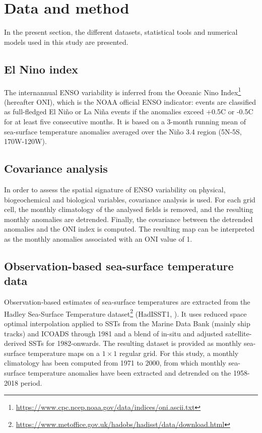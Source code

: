 \section{Data and method}

In the present section, the different datasets, statistical tools and numerical models used in this study are presented.

\subsection{El Nino index}
\label{sec:oni}

The internannual ENSO variability is inferred from the Oceanic Nino Index\footnote{\url{https://www.cpc.ncep.noaa.gov/data/indices/oni.ascii.txt}} (hereafter ONI), which is the NOAA official ENSO indicator: events are classified as full-fledged El Niño or La Niña events if the anomalies exceed +0.5C or -0.5C for at least five consecutive months. It is based on a 3-month running mean of sea-surface temperature anomalies averaged over the Niño 3.4 region (5N-5S, 170W-120W).\\

\subsection{Covariance analysis}
\label{sec:cov}

In order to assess the spatial signature of ENSO variability on physical, biogeochemical and biological variables, covariance analysis is used. For each grid cell, the monthly climatology of the analysed fields is removed, and the resulting monthly anomalies are detrended. Finally, the covariance between the detrended anomalies and the ONI index is computed. The resulting map can be interpreted as the monthly anomalies associated with an ONI value of 1.

\subsection{Observation-based sea-surface temperature data}
\label{sec:sst}

Observation-based estimates of sea-surface temperatures are extracted from the Hadley Sea-Surface Temperature dataset\footnote{\url{https://www.metoffice.gov.uk/hadobs/hadisst/data/download.html}} (HadISST1, \citealt{raynerGlobalAnalysesSea2003}). It uses reduced space optimal interpolation applied to SSTs from the Marine Data Bank (mainly ship tracks) and ICOADS through 1981 and a blend of in-situ and adjusted satellite-derived SSTs for 1982-onwards. The resulting dataset is provided as monthly sea-surface temperature maps on a $1\times 1$ regular grid. For this study, a monthly climatology has been computed from 1971 to 2000, from which monthly sea-surface temperature anomalies have been extracted and detrended on the 1958-2018 period.

